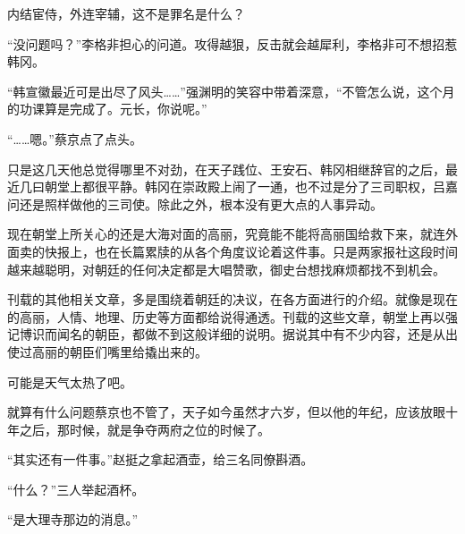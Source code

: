 内结宦侍，外连宰辅，这不是罪名是什么？

“没问题吗？”李格非担心的问道。攻得越狠，反击就会越犀利，李格非可不想招惹韩冈。

“韩宣徽最近可是出尽了风头……”强渊明的笑容中带着深意，“不管怎么说，这个月的功课算是完成了。元长，你说呢。”

“……嗯。”蔡京点了点头。

只是这几天他总觉得哪里不对劲，在天子践位、王安石、韩冈相继辞官的之后，最近几曰朝堂上都很平静。韩冈在崇政殿上闹了一通，也不过是分了三司职权，吕嘉问还是照样做他的三司使。除此之外，根本没有更大点的人事异动。

现在朝堂上所关心的还是大海对面的高丽，究竟能不能将高丽国给救下来，就连外面卖的快报上，也在长篇累牍的从各个角度议论着这件事。只是两家报社这段时间越来越聪明，对朝廷的任何决定都是大唱赞歌，御史台想找麻烦都找不到机会。

刊载的其他相关文章，多是围绕着朝廷的决议，在各方面进行的介绍。就像是现在的高丽，人情、地理、历史等方面都给说得通透。刊载的这些文章，朝堂上再以强记博识而闻名的朝臣，都做不到这般详细的说明。据说其中有不少内容，还是从出使过高丽的朝臣们嘴里给撬出来的。

可能是天气太热了吧。

就算有什么问题蔡京也不管了，天子如今虽然才六岁，但以他的年纪，应该放眼十年之后，那时候，就是争夺两府之位的时候了。

“其实还有一件事。”赵挺之拿起酒壶，给三名同僚斟酒。

“什么？”三人举起酒杯。

“是大理寺那边的消息。”
